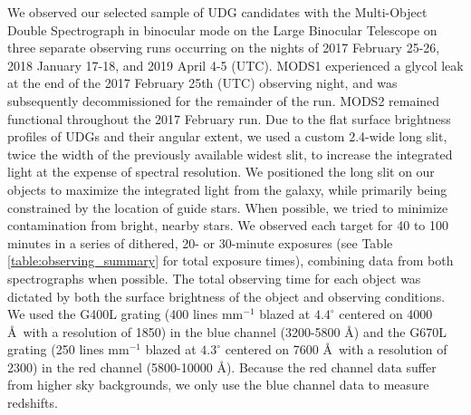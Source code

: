 \documentclass[twocolumn,tighten]{aastex63}
\begin{document}
We observed our selected sample of UDG candidates with the Multi-Object Double Spectrograph \citep[MODS;][]{Pogge2010} in binocular mode on the Large Binocular Telescope on three separate observing runs occurring on the nights of 2017 February 25-26, 2018 January 17-18, and 2019 April 4-5 (UTC). MODS1 experienced a glycol leak at the end of the 2017 February 25th (UTC) observing night, and was subsequently decommissioned for the remainder of the run. MODS2 remained functional throughout the 2017 February run.
Due to the flat surface brightness profiles of UDGs and their angular extent, we used a custom 2.4\arcsec-wide long slit, twice the width of the previously available widest slit, to increase the integrated light at the expense of spectral resolution. We positioned the long slit on our objects to maximize the integrated light from the galaxy, while primarily being constrained by the location of guide stars. When possible, we tried to minimize contamination from bright, nearby stars. We observed each target for 40 to 100 minutes in a series of dithered, 20- or 30-minute exposures (see Table \ref{table:observing_summary} for total exposure times), combining data from both spectrographs when possible. The total observing time for each object was dictated by both the surface brightness of the object and observing conditions. We used the G400L grating (400 lines mm$^{-1}$ blazed at $4.4^\circ$ centered on 4000 \AA\  with a resolution of 1850) in the blue channel (3200-5800 \AA) and the G670L grating (250 lines mm$^{-1}$ blazed at $4.3^\circ$ centered on 7600 \AA\  with a resolution of 2300) in the red channel (5800-10000 \AA). Because the red channel data suffer from higher sky backgrounds, we only use the blue channel data to measure redshifts.
\end{document}
